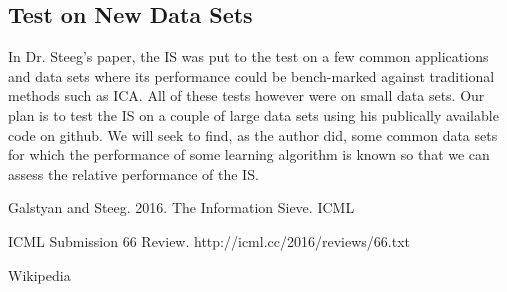 \documentclass[12pt]{article}
\begin{document}
\subsection{Test on New Data Sets}
In Dr. Steeg's paper, the IS was put to the test on a few common applications and data sets where its performance could be bench-marked against traditional methods such as ICA. All of these tests however were on small data sets. Our plan is to test the IS on a couple of large data sets using his publically available code on github. We will seek to find, as the author did, some common data sets for which the performance of some learning algorithm is known so that we can assess the relative performance of the IS. 


\begin{thebibliography}{9}
Galstyan and Steeg. 2016. The Information Sieve. ICML

 
ICML Submission 66 Review. http://icml.cc/2016/reviews/66.txt
 
Wikipedia
\end{thebibliography}
\end{document}
